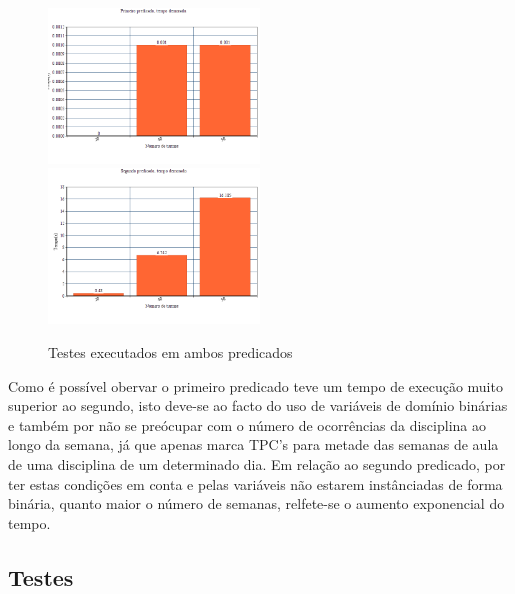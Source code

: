 \documentclass{llncs}
\begin{document}
\begin{figure}
\includegraphics[width=0.5\textwidth]{g1}
\includegraphics[width=0.5\textwidth]{g2}
\caption{Testes executados em ambos predicados}
\end{figure}
\FloatBarrier

Como é possível obervar o primeiro predicado teve um tempo de execução muito superior ao segundo, isto deve-se ao facto do uso de variáveis de domínio binárias e também por não se preócupar com o número de ocorrências da disciplina ao longo da semana, já que apenas marca TPC's para metade das semanas de aula de uma disciplina de um determinado dia.
Em relação ao segundo predicado, por ter estas condições em conta e pelas variáveis não estarem instânciadas de forma binária, quanto maior o número de semanas, relfete-se o aumento exponencial do tempo.

\subsection{ Testes}
\end{document}
